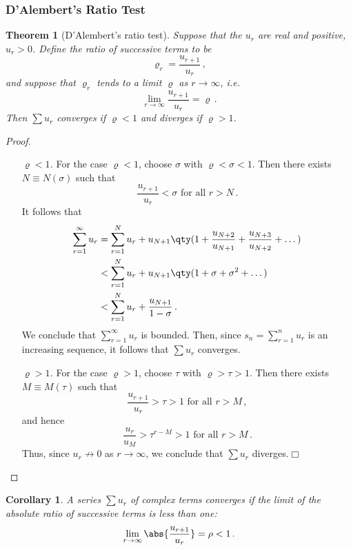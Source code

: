 \documentclass{article}
\theoremstyle{plain}\theoremheaderfont{\normalfont\itshape}\theorembodyfont{\rmfamily}\theoremseparator{.}\newtheorem*{rem}{Remark}\newtheorem*{ex}{Example}\newtheorem*{proof}{Proof}\newtheorem*{altp}{Alternative proof}
\theoremstyle{plain}\theoremheaderfont{\normalfont\bfseries}\theorembodyfont{\rmfamily}\theoremseparator{.}\newtheorem{thm}{Theorem}[section]\newtheorem{lem}[thm]{Lemma}\newtheorem{prop}[thm]{Proposition}\newtheorem*{cor}{Corollary}\newtheorem{defn}[thm]{Definition}\newtheorem{clm}[thm]{Claim}\newtheorem{clminproof}{Claim}
\theoremstyle{break}\theoremheaderfont{\normalfont\itshape}\theorembodyfont{\rmfamily}\theoremseparator{.\medskip}\newtheorem*{proofskip}{Proof}\newtheorem*{exs}{Examples}\newtheorem*{rems}{Remarks}
\theoremstyle{break}\theoremheaderfont{\normalfont\bfseries}\theorembodyfont{\rmfamily}\theoremseparator{.\medskip}\newtheorem{lemskip}[thm]{Lemma}\newtheorem{defnskip}[thm]{Definition}\newtheorem{propskip}[thm]{Proposition}\newtheorem{thmskip}[thm]{Theorem}
\numberwithin{equation}{section}
\newcommand{\qed}{\hfill\ensuremath{\Box}}
\begin{document}
	\subsubsection{D'Alembert's Ratio Test}
	\begin{thm}[D'Alembert's ratio test]		
		Suppose that the \(u_r\) are real and positive, \(u_r>0\). Define the ratio of successive terms to be
		\[\varrho_r=\frac{u_{r+1}}{u_r}\,,\]
		and suppose that \(\varrho_r\) tends to a limit \(\varrho\) as \(r\to\infty\), i.e.
		\[\lim_{r\to\infty}\frac{u_{r+1}}{u_r}=\varrho\,.\]
		Then \(\sum u_r\) converges if \(\varrho<1\) and diverges if \(\varrho>1\).
	\end{thm}
	\begin{proof}
		\begin{itemize}[topsep=0pt,leftmargin=30pt]
			\item[\textit{\(\varrho<1\).}] For the case \(\varrho<1\), choose \(\sigma\) with \(\varrho<\sigma<1\). Then there exists \(N\equiv N(\sigma)\) such that
			\[\frac{u_{r+1}}{u_r}<\sigma\text{ for all }r>N\,.\]
			It follows that
			\begin{align*}
				\sum_{r=1}^{\infty}u_r&=\sum_{r=1}^{N}u_r+u_{N+1}\qty(1+\frac{u_{N+2}}{u_{N+1}}+\frac{u_{N+3}}{u_{N+2}}+\dots)\\
				&<\sum_{r=1}^{N}u_r+u_{N+1}\qty(1+\sigma+\sigma^2+\dots)\\
				&<\sum_{r=1}^{N}u_r+\frac{u_{N+1}}{1-\sigma}\,.
			\end{align*}
			We conclude that \(\sum_{r=1}^{\infty}u_r\) is bounded. Then, since \(s_n=\sum_{r=1}^{n}u_r\) is an increasing sequence, it follows that \(\sum u_r\) converges.
		\end{itemize}
		\begin{itemize}[topsep=0pt,leftmargin=30pt]
			\item[\textit{\(\varrho>1\).}] For the case \(\varrho>1\), choose \(\tau\) with \(\varrho>\tau>1\). Then there exists \(M\equiv M(\tau)\) such that
			\[\frac{u_{r+1}}{u_r}>\tau>1\text{ for all }r>M\,,\]
			and hence
			\[\frac{u_r}{u_M}>\tau^{r-M}>1\text{ for all }r>M\,.\]
			Thus, since \(u_r\not\to 0\) as \(r\to\infty\), we conclude that \(\sum u_r\) diverges.\qed
		\end{itemize}
	\end{proof}
	\begin{cor}
		A series \(\sum u_r\) of complex terms converges if the limit of the absolute ratio of successive terms is less than one:
		\[\lim_{r\to\infty}\abs{\frac{u_{r+1}}{u_r}}=\rho<1\,.\]
	\end{cor}
\end{document}
